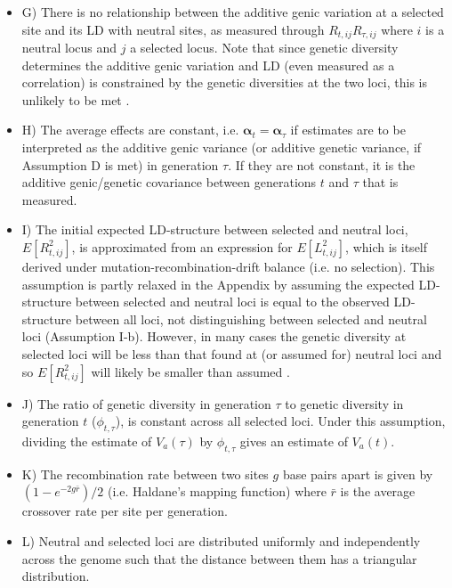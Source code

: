 \documentclass[12pt]{article}
\begin{document}
\begin{bibunit}
\begin{itemize}
\item G)  There is no relationship between the additive genic variation at a selected site and its LD with neutral sites, as measured through $R_{t, ij}R_{\tau,ij}$ where $i$ is a neutral locus and $j$ a selected locus. Note that since genetic diversity determines the additive genic variation and LD (even measured as a correlation) is constrained by the genetic diversities at the two loci, this is unlikely to be met \citep{sved2018one}.

\item H) The average effects are constant, i.e. $\boldsymbol{\alpha}_t=\boldsymbol{\alpha}_{\tau}$ if estimates are to be interpreted as the additive genic variance (or additive genetic variance, if Assumption D is met) in generation $\tau$. If they are not constant, it is the additive genic/genetic covariance between generations $t$ and $\tau$ that is measured.  

\item I) The initial expected LD-structure between selected and neutral loci, $E[R_{t,i j}^2]$, is approximated from an expression for $E[L_{t,i j}^2]$, which is itself derived under mutation-recombination-drift balance (i.e. no selection). This assumption is partly relaxed in the Appendix by assuming the expected LD-structure between selected and neutral loci is equal to the observed LD-structure between all loci, not distinguishing between selected and neutral loci (Assumption I-b). However, in many cases the genetic diversity at selected loci will be less than that found at (or assumed for) neutral loci and so $E[R_{t, ij}^2]$ will likely be smaller than assumed \citep{sved2018one}.

\item J) The ratio of genetic diversity in generation $\tau$ to genetic diversity in generation $t$ ($\phi_{t,\tau}$), is constant across all selected loci. Under this assumption, dividing the estimate of $V_a(\tau)$ by $\phi_{t,\tau}$ gives an estimate of $V_a(t)$.

\item K) The recombination rate between two sites $g$ base pairs apart is given by $(1 - e^{-2g\bar{r}})/2$ (i.e. Haldane's \citeyearpar{haldane1919map} mapping function) where $\bar{r}$ is the average crossover rate per site per generation. 

\item L) Neutral and selected loci are distributed uniformly and independently across the genome such that the distance between them has a triangular distribution. 


\end{itemize}
\end{bibunit}
\end{document}
